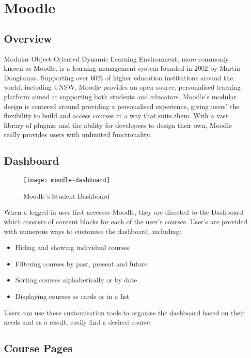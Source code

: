 \section{Moodle}
\subsection{Overview}
Modular Object-Oriented Dynamic Learning Environment, more commonly known as Moodle, is a learning management system founded in 2002 by Martin Dougiamas.
Supporting over 60\% of higher education institutions around the world, including UNSW, Moodle provides an open-source, personalised learning platform aimed at supporting both students and educators.
\cite{moodleLMS}
Moodle's modular design is centered around providing a personalised experience, giving users' the flexibility to build and access courses in a way that suits them.
With a vast library of plugins, and the ability for developers to design their own, Moodle really provides users with unlimited functionality. \cite{moodleIntro}

\subsection{Dashboard}

\begin{figure}[h!]
    \centering
    \texttt{[image: moodle-dashboard]}
    \caption{Moodle's Student Dashboard}
\end{figure}

When a logged-in user first accesses Moodle, they are directed to the Dashboard which consists of content blocks for each of the user's courses.
User's are provided with numerous ways to customise the dashboard, including:

\begin{itemize}
    \item Hiding and showing individual courses
    \item Filtering courses by past, present and future
    \item Sorting courses alphabetically or by date
    \item Displaying courses as cards or in a list
\end{itemize}

Users can use these customisation tools to organise the dashboard based on their needs and as a result, easily find a desired course.

\subsection{Course Pages}


